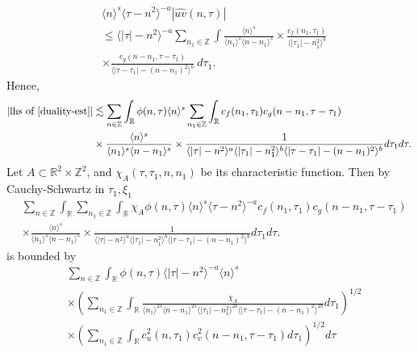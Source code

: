 \documentclass[12pt,reqno]{amsart}
\numberwithin{equation}{section}  %
\numberwithin{figure}{section}
\newcommand{\rr}{\mathbb{R}}
\newcommand{\zz}{\mathbb{Z}}
\newcommand{\wh}{\widehat}
\theoremstyle{plain}
\theoremstyle{definition}
\theoremstyle{remark}
\begin{document}
%
%
\begin{equation}
	\label{convo-est-starting-pnt}
	\begin{split}
		 & \langle n \rangle^s \langle \tau - n^{2} \rangle^{-a} | \wh{uv}\left( 
		n, \tau \right) |
		\\
		& \le \langle |\tau| - n^{2} \rangle^{-a}
		\sum_{n_1 \in \zz} \int \frac{\langle n \rangle^{s}}{\langle n_1 \rangle^s
    \langle n - n_1 \rangle^s} 
		\times \frac{c_f(n_1, \tau_1)}{\langle |\tau_1| - n_1^{2} \rangle ^{b}}
		\\
		& \times
		\frac{c_g(n - n_1, \tau - \tau_1 )}{\langle |\tau - \tau_1| - (n - n_1)^{2}
    \rangle^{b}}\ d \tau_1.
	\end{split}
\end{equation}
%
%
Hence, 
%
%
\begin{equation}
  \label{pre-fubini-int-form}
	\begin{split}
    |\text{lhs of} \ \eqref{duality-est}|
	& \lesssim \sum_{n \in \zz} \int_{\rr} \phi(n, \tau) \langle n \rangle^s 
  \sum_{n_1 \in \zz}
  \int_{\rr} c_f(n_1, \tau_1)
		c_g(n - n_1, \tau - \tau_1 )
		\\
    & \times \frac{\langle n \rangle ^{s}}{\langle n_{1} \rangle ^{s} \langle
    n-n_{1} \rangle ^{s}} \times \frac{1}{\langle |\tau| - n^{2} \rangle
    ^{a}\langle |\tau_{1}|-n_{1}^{2} \rangle ^{b}\langle | \tau -
    \tau_{1}|-(n - n_{1})^{2}
    \rangle ^{b}} d \tau_1 d \tau.
	\end{split}
\end{equation}
%
Let $A \subset \rr^{2} \times \zz^{2}$, and $\chi_{A}(\tau, \tau_{1}, n, n_{1})$
be its
characteristic function. Then by Cauchy-Schwartz in
$\tau_{1}, \xi_{1}$
\begin{equation*}
	\begin{split}
    & \sum_{n \in \zz} \int_{\rr}   \sum_{n_1 \in \zz}
    \int_{\rr} \chi_{A}
    \phi(n, \tau) \langle n \rangle^s \langle \tau - n^{2} \rangle^{-a}
  c_f(n_1, \tau_1)
		c_g(n - n_1, \tau - \tau_1 )
		\\
    & \times \frac{\langle n \rangle ^{s}}{\langle n_{1} \rangle ^{s} \langle
    n-n_{1} \rangle ^{s}} \times \frac{1}{\langle |\tau| - n^{2} \rangle
    ^{a}\langle |\tau_{1}|-n_{1}^{2} \rangle ^{b}\langle | \tau -
    \tau_{1}|-(n - n_{1})^{2}
    \rangle ^{b}} d \tau_1 d \tau.
	\end{split}
\end{equation*}
%
is bounded by 
%
%
\begin{equation}
	\label{10g}
	\begin{split}
    & \sum_{n \in \zz} \int_{\rr} \phi(n, \tau) \langle | \tau | - n^{2} \rangle
    ^{-a} \langle n \rangle ^{s}
    \\
    & \times \left( \sum_{n_{1} \in \zz} \int_{\rr}
    \frac{\chi_{A}}{\langle n_{1} \rangle ^{2s} \langle n-n_{1} \rangle ^{2s} \langle |
    \tau_{1} | - n_{1}^{2}\rangle ^{2b} \langle | \tau - \tau_{1} | -
    (n - n_{1})^{2} \rangle ^{2b}} d \tau_{1} \right)^{1/2}
    \\
    & \times \left( \sum_{n_{1} \in \zz} \int_{\rr} c_{u}^{2}(n, \tau_{1})
    c_{v}^{2}(n - n_{1}, \tau - \tau_{1}) d \tau_{1} \right)^{1/2} d \tau
  \end{split}
\end{equation}
\end{document}
